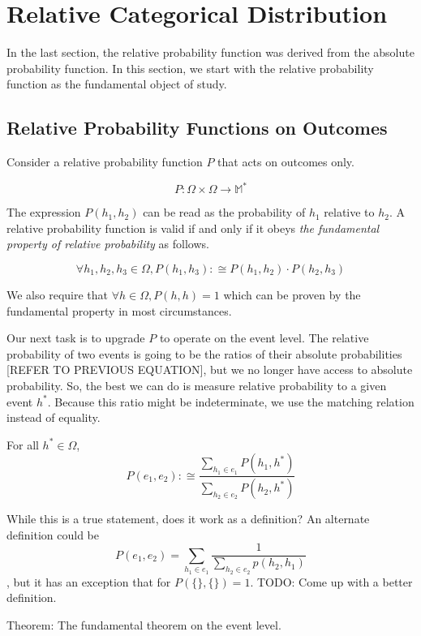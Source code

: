 \documentclass[twoside]{article}
\begin{document}
\section{Relative Categorical Distribution}

In the last section, the relative probability function was derived from the absolute probability function. In this section, we start with the relative probability function as the fundamental object of study.

\subsection{Relative Probability Functions on Outcomes}

Consider a relative probability function \(P\) that acts on outcomes only.

\[P: \Omega \times \Omega \rightarrow \mathbb{M}^*\]

The expression \(P(h_1, h_2)\) can be read as the probability of \(h_1\) relative to \(h_2\). A relative probability function is valid if and only if it obeys \textit{the fundamental property of relative probability} as follows.

\begin{equation}
\label{eq:fundamental}
\forall h_1, h_2, h_3 \in \Omega, P(h_1, h_3) :\cong P(h_1, h_2) \cdot P(h_2, h_3)
\end{equation}

We also require that \(\forall h \in \Omega, P(h, h) = 1\) which can be proven by the fundamental property in most circumstances.

Our next task is to upgrade \(P\) to operate on the event level. The relative probability of two events is going to be the ratios of their absolute probabilities [REFER TO PREVIOUS EQUATION], but we no longer have access to absolute probability. So, the best we can do is measure relative probability to a given event \(h^*\). Because this ratio might be indeterminate, we use the matching relation instead of equality.

For all \(h^* \in \Omega\), \[P(e_1, e_2) :\cong \frac{\sum_{h_1 \in e_1} P(h_1, h^*)}{\sum_{h_2 \in e_2} P(h_2, h^*)}\]

While this is a true statement, does it work as a definition? An alternate definition could be \[P(e_1, e_2) = \sum_{h_1 \in e_1} \frac{1}{\sum_{h_2 \in e_2} p(h_2, h_1)}\], but it has an exception that for \(P(\{\},\{\}) = 1\). TODO: Come up with a better definition.

Theorem: The fundamental theorem on the event level.
\end{document}
